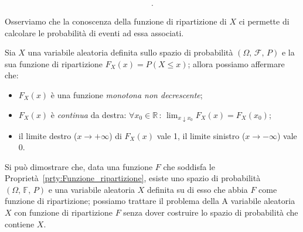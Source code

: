 \begin{obsv}
\begin{enumerate}[\indent (a)]
\begin{align*}
                    .\end{align*}
            \end{enumerate}
            Osserviamo che la conoscenza della funzione di ripartizione di $X$ ci permette di calcolare le probabilità di eventi ad essa associati.
            \begin{prty}\label{prty:Funzione_ripartizione}
                Sia $X$ una variabile aleatoria definita sullo spazio di probabilità $(\Omega,\,\mathscr{F},\,P)$ e la sua funzione di ripartizione $F_X(x) = P(X \leq x)$; allora possiamo affermare che:
                \begin{itemize}
                    \item $F_X(x)$ è una funzione \emph{monotona non decrescente};
                    \item $F_X(x)$ è \emph{continua} da destra: $\forall x_0 \in \mathbb{R} \,:\, \lim_{x \downarrow x_0} F_X(x) = F_X(x_0)$;
                    \item il limite destro ($x \rightarrow +\infty$) di $F_X(x)$ vale 1, il limite sinistro ($x \rightarrow -\infty$) vale 0.
                \end{itemize}
            \end{prty}
            \begin{obsv}
                Si può dimostrare che, data una funzione $F$ che soddisfa le Proprietà~\ref{prty:Funzione_ripartizione}, esiste uno spazio di probabilità $(\Omega,\,\mathbb{F},\,P)$ e una variabile aleatoria $X$ definita su di esso che abbia $F$ come funzione di ripartizione; possiamo trattare il problema della A variabile aleatoria $X$ con funzione di ripartizione $F$ senza dover costruire lo spazio di probabilità che contiene $X$.
            \end{obsv}
        \end{obsv}
